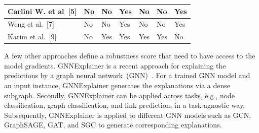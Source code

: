 \begin{table}[h]
\begin{tabular}{l|l|l|l|l|l|l}
        \hline
        Carlini W. et al~[5] & No                    & No        & Yes            & No             & No       & Yes         \\ 
        \hline
        Weng et al.~[7]          & No                    & No        & Yes            & No             & No       & Yes         \\ 
        \hline
        Karim et al.~[9]        & No                    & Yes       & Yes            & Yes            & Yes      & No          \\
        \hline
    \end{tabular}
    \vspace{-4mm}
\end{table}

\hspace*{3.5mm} A few other approaches define a robustness score that need to have access to the model gradients. GNNExplainer is a recent approach for explaining the predictions by a graph neural network~(GNN)~\cite{ying2019gnnexplainer}. For a trained GNN model and an input instance, GNNExplainer generates the explanations via a dense subgraph. Secondly, GNNExplainer can be applied across tasks, e.g., node classification, graph classification, and link prediction, in a task-agnostic way. Subsequently, GNNExplainer is applied to different GNN models such as GCN, GraphSAGE, GAT, and SGC to generate corresponding explanations. 

